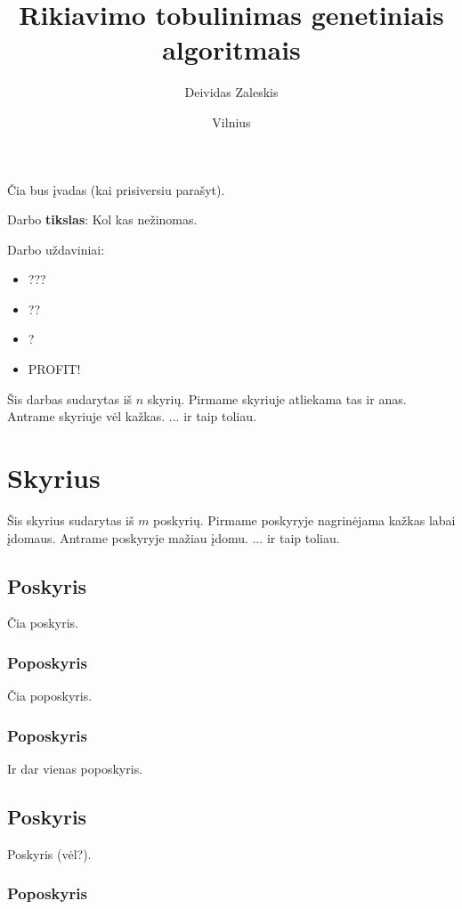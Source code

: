 \documentclass{VUMIFInfKursinis}
\institute{Informatikos institutas}  %
\title{Rikiavimo tobulinimas genetiniais algoritmais}
\author{Deividas Zaleskis}
\date{Vilnius \\ \the\year}
\begin{document}
\maketitle

\tableofcontents


Čia bus įvadas (kai prisiversiu parašyt).

Darbo \textbf{tikslas}:
Kol kas nežinomas.


Darbo uždaviniai:
\begin{itemize}
  \item ???
  \item ??
  \item ?
  \item PROFIT!
\end{itemize}

Šis darbas sudarytas iš $n$ skyrių.
Pirmame skyriuje atliekama tas ir anas.
Antrame skyriuje vėl kažkas.
... ir taip toliau.

\section{Skyrius}

Šis skyrius sudarytas iš $m$ poskyrių.
Pirmame poskyryje nagrinėjama kažkas labai įdomaus.
Antrame poskyryje mažiau įdomu.
... ir taip toliau.

\subsection{Poskyris}

Čia poskyris.

\subsubsection{Poposkyris}

Čia poposkyris.

\subsubsection{Poposkyris}

Ir dar vienas poposkyris.

\subsection{Poskyris}

Poskyris (vėl?).

\subsubsection{Poposkyris}
\end{document}
